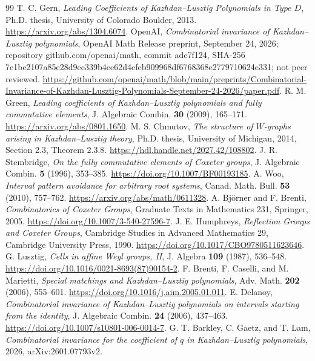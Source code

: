 \documentclass[11pt]{article}
\theoremstyle{definition}\newtheorem{definition}[theorem]{Definition}
\theoremstyle{remark}\newtheorem{remark}[theorem]{Remark}
\begin{document}
\begin{thebibliography}{99}
 T. C. Gern, \emph{Leading Coefficients of
Kazhdan--Lusztig Polynomials in Type $D$}, Ph.D. thesis, University
of Colorado Boulder, 2013. \url{https://arxiv.org/abs/1304.6074}.
 OpenAI, \emph{Combinatorial invariance of
Kazhdan--Lusztig polynomials}, OpenAI Math Release preprint, September 24, 2026;
repository github.com/openai/math, commit adc7f124, SHA-256
7e1be2107a85e28d9ec339b4ee62d4efeb909968df6768368e2779710624e331; not peer reviewed.
\url{https://github.com/openai/math/blob/main/preprints/Combinatorial-Invariance-of-Kazhdan-Lusztig-Polynomials-September-24-2026/paper.pdf}.
 R. M. Green, \emph{Leading coefficients of
Kazhdan--Lusztig polynomials and fully commutative elements},
J. Algebraic Combin. \textbf{30} (2009), 165--171.
\url{https://arxiv.org/abs/0801.1650}.
 M. S. Chmutov, \emph{The structure of $W$-graphs
arising in Kazhdan--Lusztig theory}, Ph.D. thesis, University of
Michigan, 2014, Section 2.3, Theorem 2.3.8.
\url{https://hdl.handle.net/2027.42/108802}.
 J. R. Stembridge, \emph{On the fully commutative
elements of Coxeter groups}, J. Algebraic Combin. \textbf{5} (1996),
353--385. \url{https://doi.org/10.1007/BF00193185}.
 A. Woo, \emph{Interval pattern avoidance for arbitrary
root systems}, Canad. Math. Bull. \textbf{53} (2010), 757--762.
\url{https://arxiv.org/abs/math/0611328}.
 A. Bj\"orner and F. Brenti,
\emph{Combinatorics of Coxeter Groups}, Graduate Texts in Mathematics
231, Springer, 2005. \url{https://doi.org/10.1007/3-540-27596-7}.
 J. E. Humphreys, \emph{Reflection Groups and
Coxeter Groups}, Cambridge Studies in Advanced Mathematics 29,
Cambridge University Press, 1990.
\url{https://doi.org/10.1017/CBO9780511623646}.
 G. Lusztig, \emph{Cells in affine Weyl groups, II},
J. Algebra \textbf{109} (1987), 536--548.
\url{https://doi.org/10.1016/0021-8693(87)90154-2}.
 F. Brenti, F. Caselli, and M. Marietti,
\emph{Special matchings and Kazhdan--Lusztig polynomials},
Adv. Math. \textbf{202} (2006), 555--601.
\url{https://doi.org/10.1016/j.aim.2005.01.011}.
 E. Delanoy, \emph{Combinatorial invariance of
Kazhdan--Lusztig polynomials on intervals starting from the identity},
J. Algebraic Combin. \textbf{24} (2006), 437--463.
\url{https://doi.org/10.1007/s10801-006-0014-7}.
 G. T. Barkley, C. Gaetz, and T. Lam,
\emph{Combinatorial invariance for the coefficient of $q$ in
Kazhdan--Lusztig polynomials}, 2026, arXiv:2601.07793v2.

\end{thebibliography}
\end{document}
